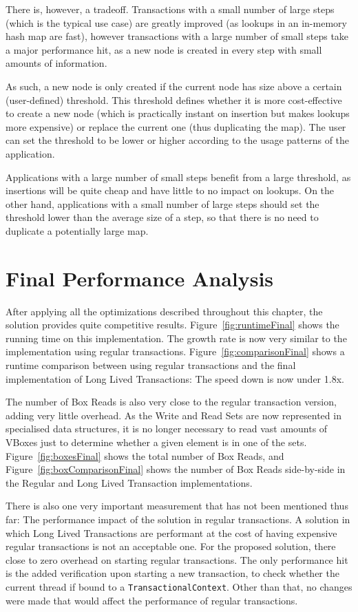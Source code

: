 There is, however, a tradeoff. Transactions with a small number of large
steps (which is the typical use case) are greatly improved (as lookups
in an in-memory hash map are fast), however transactions with a large
number of small steps take a major performance hit, as a new node is
created in every step with small amounts of information.

As such, a new node is only created if the current node has size above
a certain (user-defined) threshold. This threshold defines whether it
is more cost-effective to create a new node (which is practically
instant on insertion but makes lookups more expensive) or replace the
current one (thus duplicating the map). The user can set the threshold
to be lower or higher according to the usage patterns of the
application.

Applications with a large number of small steps benefit from a large
threshold, as insertions will be quite cheap and have little to no
impact on lookups. On the other hand, applications with a small number
of large steps should set the threshold lower than the average size of
a step, so that there is no need to duplicate a potentially large map.

\section{Final Performance Analysis}

After applying all the optimizations described throughout this
chapter, the solution provides quite competitive
results. Figure~\ref{fig:runtimeFinal} shows the running time on this
implementation. The growth rate is now very similar to the
implementation using regular
transactions. Figure~\ref{fig:comparisonFinal} shows a runtime
comparison between using regular transactions and the final
implementation of Long Lived Transactions: The speed down is now under
1.8x.

The number of Box Reads is also very close to the regular transaction
version, adding very little overhead. As the Write and Read Sets are
now represented in specialised data structures, it is no longer
necessary to read vast amounts of VBoxes just to determine whether a
given element is in one of the sets. Figure~\ref{fig:boxesFinal} shows
the total number of Box Reads, and Figure~\ref{fig:boxComparisonFinal}
shows the number of Box Reads side-by-side in the Regular and Long
Lived Transaction implementations.

There is also one very important measurement that has not been
mentioned thus far: The performance impact of the solution in regular
transactions. A solution in which Long Lived Transactions are
performant at the cost of having expensive regular transactions is not
an acceptable one. For the proposed solution, there close to zero
overhead on starting regular transactions. The only performance hit is the
added verification upon starting a new transaction, to check whether
the current thread if bound to a \texttt{TransactionalContext}. Other
than that, no changes were made that would affect the performance of
regular transactions.

